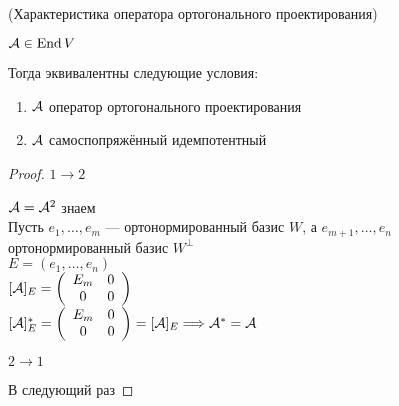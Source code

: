 \begin{theorem}(Характеристика оператора ортогонального проектирования)

    $\mathcal{A} \in \operatorname{End}{V}$

    Тогда эквивалентны следующие условия:
    \begin{enumerate}
        \item $\mathcal{A}$ оператор ортогонального проектирования
        \item $\mathcal{A}$ самоспопряжённый идемпотентный
    \end{enumerate}

    \begin{proof}
    \emptyln
    $ 1 \to 2 $

    $ \mathcal{A} = \mathcal{A}^2 $ знаем \\
    Пусть $e_1, \dots, e_m$ --- ортонормированный базис $W$, а $e_{m + 1}, \dots, e_n$ ортонормированный базис $W^{\perp}$ \\
    $E = (e_1, \dots, e_n)$ \\
    $[\mathcal{A}]_E = \left(\begin{array}{cc}
    E_m & 0 \\ 
    0 & 0
    \end{array}\right)$ \\
    $[\mathcal{A}]^*_E = \left(\begin{array}{cc}
    E_m & 0 \\ 
    0 & 0
    \end{array}\right) = [\mathcal{A}]_E \Longrightarrow \mathcal{A}^* = \mathcal{A}$

    $2 \to 1$

    В следующий раз
    \end{proof}
\end{theorem}
